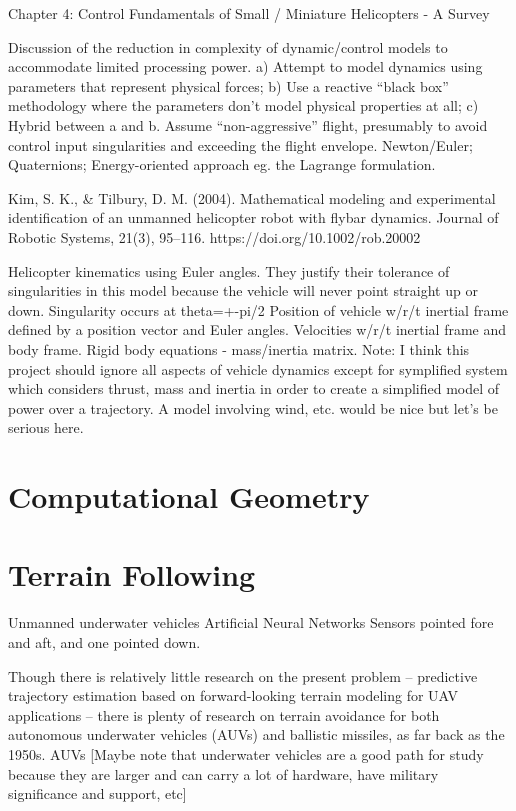 \documentclass[10pt]{article}
\begin{document}
Chapter 4: Control Fundamentals of Small / Miniature Helicopters - A Survey

Discussion of the reduction in complexity of dynamic/control models to accommodate limited processing power. 
a) Attempt to model dynamics using parameters that represent physical forces; b) Use a reactive “black box” methodology where the parameters don’t model physical properties at all; c) Hybrid between a and b.
Assume “non-aggressive” flight, presumably to avoid control input singularities and exceeding the flight envelope.
Newton/Euler; Quaternions; Energy-oriented approach eg. the Lagrange formulation.

\cite{Kim2004}
Kim, S. K., \& Tilbury, D. M. (2004). Mathematical modeling and experimental identification of an unmanned helicopter robot with flybar dynamics. Journal of Robotic Systems, 21(3), 95–116. https://doi.org/10.1002/rob.20002

Helicopter kinematics using Euler angles. They justify their tolerance of singularities in this model because the vehicle will never point straight up or down. Singularity occurs at theta=+-pi/2
Position of vehicle w/r/t inertial frame defined by a position vector and Euler angles.
Velocities w/r/t inertial frame and body frame.
Rigid body equations - mass/inertia matrix.
Note: I think this project should ignore all aspects of vehicle dynamics except for symplified system which considers thrust, mass and inertia in order to create a simplified model of power over a trajectory. A model involving wind, etc. would be nice but let’s be serious here.


\section{Computational Geometry}



\section{Terrain Following}

Unmanned underwater vehicles
Artificial Neural Networks
Sensors pointed fore and aft, and one pointed down.

Though there is relatively little research on the present problem -- predictive trajectory estimation based on forward-looking terrain modeling for UAV applications -- there is plenty of research on terrain avoidance for both autonomous underwater vehicles (AUVs) and ballistic missiles, as far back as the 1950s. 
AUVs
[Maybe note that underwater vehicles are a good path for study because they are larger and can carry a lot of hardware, have military significance and support, etc]
\end{document}
